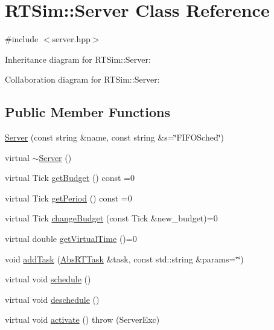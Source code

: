 \hypertarget{classRTSim_1_1Server}{}\section{R\+T\+Sim\+:\+:Server Class Reference}
\label{classRTSim_1_1Server}


{\ttfamily \#include $<$server.\+hpp$>$}



Inheritance diagram for R\+T\+Sim\+:\+:Server\+:


Collaboration diagram for R\+T\+Sim\+:\+:Server\+:
\subsection*{Public Member Functions}
\begin{DoxyCompactItemize}
\item 
\hyperlink{classRTSim_1_1Server_a6bd5941c1123b004d076c4a66168eeac}{Server} (const string \&name, const string \&s=\char`\"{}F\+I\+F\+O\+Sched\char`\"{})
\item 
virtual \hyperlink{classRTSim_1_1Server_a1e868ef596b3dd68163fd443016027d2}{$\sim$\+Server} ()
\item 
virtual Tick \hyperlink{classRTSim_1_1Server_a9a631df5ed8fcf2939eaa117cc652c90}{get\+Budget} () const =0
\item 
virtual Tick \hyperlink{classRTSim_1_1Server_a0e3112770d8344442fcb51b88cf7ce3d}{get\+Period} () const =0
\item 
virtual Tick \hyperlink{classRTSim_1_1Server_a48d58b30f36de937de7ce3e4700bd18c}{change\+Budget} (const Tick \&new\+\_\+budget)=0
\item 
virtual double \hyperlink{classRTSim_1_1Server_a1397b6ddbad8ed5857c7242261ec737d}{get\+Virtual\+Time} ()=0
\item 
void \hyperlink{classRTSim_1_1Server_ae7adeccb215db9a59a140b5035012f6f}{add\+Task} (\hyperlink{classRTSim_1_1AbsRTTask}{Abs\+R\+T\+Task} \&task, const std\+::string \&params=\char`\"{}\char`\"{})
\item 
virtual void \hyperlink{classRTSim_1_1Server_af7ad595b07021fc0f3f0dec217b85252}{schedule} ()
\item 
virtual void \hyperlink{classRTSim_1_1Server_a0120bbb5d25d649276e3afbda19831ad}{deschedule} ()
\item 
virtual void \hyperlink{classRTSim_1_1Server_a146b7ce07b37f879831e91bfd7332c52}{activate} ()  throw (\+Server\+Exc)
\item 

\end{DoxyCompactItemize}
